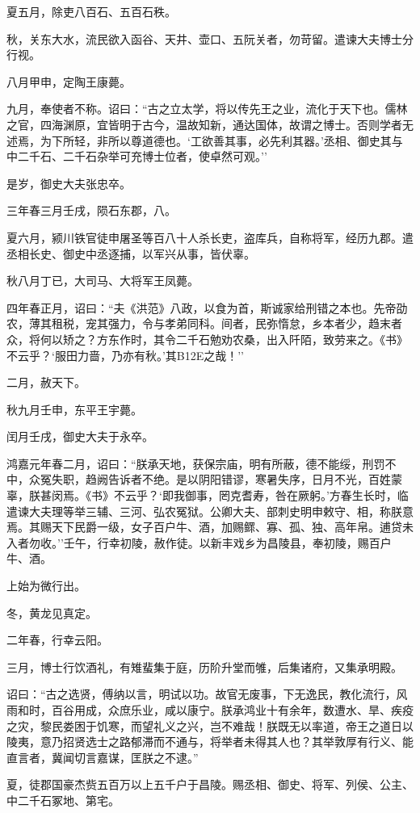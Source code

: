 \documentclass[]{article}
\begin{document}
夏五月，除吏八百石、五百石秩。

秋，关东大水，流民欲入函谷、天井、壶口、五阮关者，勿苛留。遣谏大夫博士分行视。

八月甲申，定陶王康薨。

九月，奉使者不称。诏曰：``古之立太学，将以传先王之业，流化于天下也。儒林之官，四海渊原，宜皆明于古今，温故知新，通达国体，故谓之博士。否则学者无述焉，为下所轻，非所以尊道德也。`工欲善其事，必先利其器。'丞相、御史其与中二千石、二千石杂举可充博士位者，使卓然可观。''

是岁，御史大夫张忠卒。

三年春三月壬戌，陨石东郡，八。

夏六月，颍川铁官徒申屠圣等百八十人杀长吏，盗库兵，自称将军，经历九郡。遣丞相长史、御史中丞逐捕，以军兴从事，皆伏辜。

秋八月丁已，大司马、大将军王凤薨。

四年春正月，诏曰：``夫《洪范》八政，以食为首，斯诚家给刑错之本也。先帝劭农，薄其租税，宠其强力，令与孝弟同科。间者，民弥惰怠，乡本者少，趋末者众，将何以矫之？方东作时，其令二千石勉劝农桑，出入阡陌，致劳来之。《书》不云乎？`服田力啬，乃亦有秋。'其B12E之哉！''

二月，赦天下。

秋九月壬申，东平王宇薨。

闰月壬戌，御史大夫于永卒。

鸿嘉元年春二月，诏曰：``朕承天地，获保宗庙，明有所蔽，德不能绥，刑罚不中，众冤失职，趋阙告诉者不绝。是以阴阳错谬，寒暑失序，日月不光，百姓蒙辜，朕甚闵焉。《书》不云乎？`即我御事，罔克耆寿，咎在厥躬。'方春生长时，临遣谏大夫理等举三辅、三河、弘农冤狱。公卿大夫、部刺史明申敕守、相，称朕意焉。其赐天下民爵一级，女子百户牛、酒，加赐鳏、寡、孤、独、高年帛。逋贷未入者勿收。''壬午，行幸初陵，赦作徒。以新丰戏乡为昌陵县，奉初陵，赐百户牛、酒。

上始为微行出。

冬，黄龙见真定。

二年春，行幸云阳。

三月，博士行饮酒礼，有雉蜚集于庭，历阶升堂而雊，后集诸府，又集承明殿。

诏曰：``古之选贤，傅纳以言，明试以功。故官无废事，下无逸民，教化流行，风雨和时，百谷用成，众庶乐业，咸以康宁。朕承鸿业十有余年，数遭水、旱、疾疫之灾，黎民娄困于饥寒，而望礼义之兴，岂不难哉！朕既无以率道，帝王之道日以陵夷，意乃招贤选士之路郁滞而不通与，将举者未得其人也？其举敦厚有行义、能直言者，冀闻切言嘉谋，匡朕之不逮。''

夏，徒郡国豪杰赀五百万以上五千户于昌陵。赐丞相、御史、将军、列侯、公主、中二千石冢地、第宅。
\end{document}
